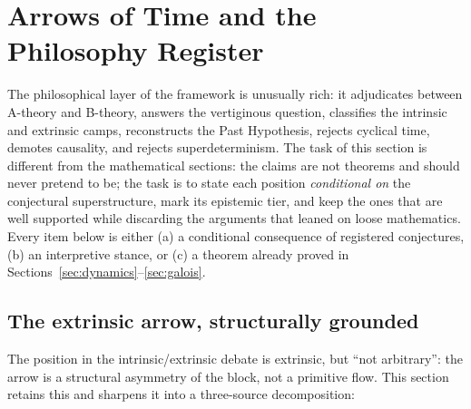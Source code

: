 
\section{Arrows of Time and the Philosophy Register}\label{sec:philosophy}

The philosophical layer of the framework is unusually rich: it adjudicates between A-theory and
B-theory, answers the vertiginous question, classifies the intrinsic and extrinsic camps,
reconstructs the Past Hypothesis, rejects cyclical time, demotes causality, and rejects
superdeterminism. The task of this section is different from the mathematical
sections: the claims are not theorems and should never pretend to be; the task is to state
each position \emph{conditional on} the conjectural superstructure, mark its epistemic tier,
and keep the ones that are well supported while discarding the arguments that leaned on
loose mathematics. Every item below is either (a) a conditional consequence of
registered conjectures, (b) an interpretive stance, or (c) a theorem already
proved in Sections~\ref{sec:dynamics}--\ref{sec:galois}.

\subsection{The extrinsic arrow, structurally grounded}

The position in the intrinsic/extrinsic debate is extrinsic, but ``not
arbitrary'': the arrow is a structural asymmetry of the block, not a primitive flow. This
section retains this and sharpens it into a three-source decomposition:


